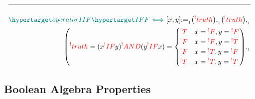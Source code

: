 \documentclass[a4paper]{article}
\def\ml{\mleft}
\def\mr{\mright}
\newcommand{\defeq}{:=}
\newcommand{\eq}{=}
\newcommand{\cusand}{,}
\newcommand{\cusend}{.}
\newcommand{\cusnum}[2]{{#1}_{{\phantom{ }}_{#2}}}
\newcommand{\n}{\\[1.5ex] \hline \nonumber \\[0ex]}
\newcommand{\m}{\nonumber \\}
\begin{document}
\begin{tcolorbox}
\begin{align}
    \n \dfn{operatorIIF} [\dfn{IFF}[\iff]][x, y] \cusnum{\defeq}{1} \ml(\rfr{truth} [x][]\mr) \cusnum{\cusand}{1} \ml(\rfr{truth} [y][]\mr) \cusnum{\cusand}{1}
\m \ml(\rfr{truth} [x \rfr{IFF} y][] \eq (x \rfr{IF} y) \rfr{AND} (y \rfr{IF} x) \eq \begin{cases} \rfr{T} & x \eq \rfr{F} \cusand y \eq \rfr{F} \\ \rfr{F} & x \eq \rfr{F} \cusand y \eq \rfr{T} \\ \rfr{F} & x \eq \rfr{T} \cusand y \eq \rfr{F} \\ \rfr{T} & x \eq \rfr{T} \cusand y \eq \rfr{T} \end{cases}\mr) \cusnum{\cusend}{1}
\end{align}
\end{tcolorbox}


\subsection{Boolean Algebra Properties}
\end{document}
